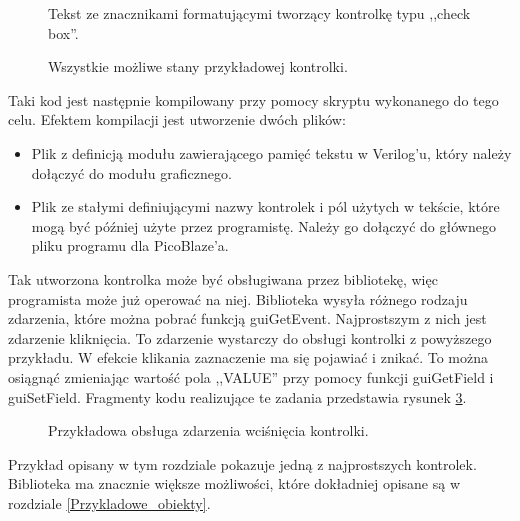\begin{figure}[h]
	\centering
	\setlength{\fboxsep}{2mm}
	\setlength{\fboxrule}{0.5pt}
	\caption{ Tekst ze znacznikami formatującymi tworzący kontrolkę typu ,,check box''. }
	\label{ftCheckBox}
\end{figure}

\begin{figure}[h]
	\centering
	\caption{ Wszystkie możliwe stany przykładowej kontrolki. }
	\label{ftCheckBoxResult}
\end{figure}

Taki kod jest następnie kompilowany przy pomocy skryptu wykonanego do tego celu. Efektem kompilacji jest utworzenie dwóch plików:

\begin{itemize}
	\item Plik z definicją modułu zawierającego pamięć tekstu w Verilog'u, który należy dołączyć do modułu graficznego.
	\item Plik ze stałymi definiującymi nazwy kontrolek i pól użytych w tekście, które mogą być później użyte przez programistę. Należy go dołączyć do głównego pliku programu dla PicoBlaze'a.
\end{itemize}

Tak utworzona kontrolka może być obsługiwana przez bibliotekę, więc programista może już operować na niej. Biblioteka wysyła różnego rodzaju zdarzenia, które można pobrać funkcją {\ttfamily guiGetEvent}. Najprostszym z nich jest zdarzenie kliknięcia. To zdarzenie wystarczy do obsługi kontrolki z powyższego przykładu. W efekcie klikania zaznaczenie ma się pojawiać i znikać. To można osiągnąć zmieniając wartość pola ,,VALUE'' przy pomocy funkcji {\ttfamily guiGetField} i {\ttfamily guiSetField}. Fragmenty kodu realizujące te zadania przedstawia rysunek \ref{ftCheckBoxPsm}.

\begin{figure}[h]
	\centering
	\setlength{\fboxsep}{2mm}
	\setlength{\fboxrule}{0.5pt}
	\caption{ Przykładowa obsługa zdarzenia wciśnięcia kontrolki. }
	\label{ftCheckBoxPsm}
\end{figure}

Przykład opisany w tym rozdziale pokazuje jedną z najprostszych kontrolek. Biblioteka ma znacznie większe możliwości, które dokładniej opisane są w rozdziale \ref{Przykladowe_obiekty}.


